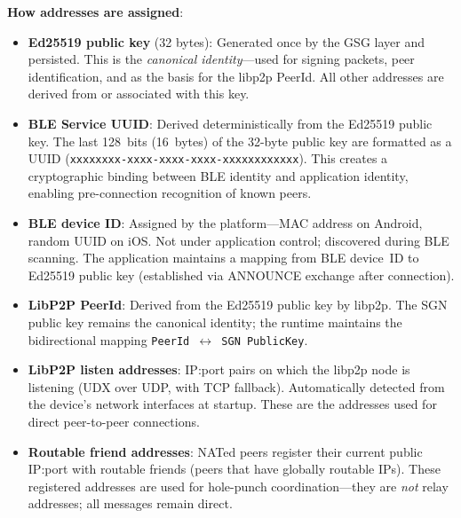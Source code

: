 \documentclass[11pt,a4paper]{article}
\begin{document}
\textbf{How addresses are assigned}:
\begin{itemize}[nosep]
  \item \textbf{Ed25519 public key} (32 bytes): Generated once by the GSG layer and persisted. This is the \emph{canonical identity}---used for signing packets, peer identification, and as the basis for the libp2p PeerId. All other addresses are derived from or associated with this key.
  \item \textbf{BLE Service UUID}: Derived deterministically from the Ed25519 public key. The last 128~bits (16~bytes) of the 32-byte public key are formatted as a UUID (\texttt{xxxxxxxx-xxxx-xxxx-xxxx-xxxxxxxxxxxx}). This creates a cryptographic binding between BLE identity and application identity, enabling pre-connection recognition of known peers.
  \item \textbf{BLE device ID}: Assigned by the platform---MAC address on Android, random UUID on iOS. Not under application control; discovered during BLE scanning. The application maintains a mapping from BLE device~ID to Ed25519 public key (established via ANNOUNCE exchange after connection).
  \item \textbf{LibP2P PeerId}: Derived from the Ed25519 public key by libp2p. The SGN public key remains the canonical identity; the runtime maintains the bidirectional mapping \texttt{PeerId $\leftrightarrow$ SGN PublicKey}.
  \item \textbf{LibP2P listen addresses}: IP:port pairs on which the libp2p node is listening (UDX over UDP, with TCP fallback). Automatically detected from the device's network interfaces at startup. These are the addresses used for direct peer-to-peer connections.
  \item \textbf{Routable friend addresses}: NATed peers register their current public IP:port with routable friends (peers that have globally routable IPs). These registered addresses are used for hole-punch coordination---they are \emph{not} relay addresses; all messages remain direct.
\end{itemize}
\end{document}
